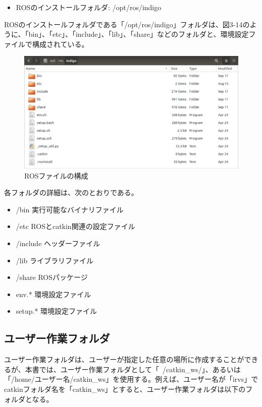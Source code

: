 \begin{itemize}
\item ROSのインストールフォルダ: /opt/ros/indigo
\end{itemize}

ROSのインストールフォルダである「/opt/ros/indigo」フォルダは、図3-14のように、「bin」、「etc」、「include」、「lib」、「share」などのフォルダと、環境設定ファイルで構成されている。

\begin{figure}[h]
  \centering
  \includegraphics[width=\columnwidth]{pictures/chapter3/pic_03_14.png}
  \caption{ROSファイルの構成}
\end{figure}

各フォルダの詳細は、次のとおりである。

\begin{itemize}
\item /bin    実行可能なバイナリファイル
\item /etc    ROSとcatkin関連の設定ファイル
\item /include  ヘッダーファイル
\item /lib    ライブラリファイル
\item /share  ROSパッケージ
\item env.*   環境設定ファイル
\item setup.* 環境設定ファイル
\end{itemize}

\subsection{ユーザー作業フォルダ}

ユーザー作業フォルダは、ユーザーが指定した任意の場所に作成することができるが、本書では、ユーザー作業フォルダとして「~/catkin\_ws/」、あるいは「/home/ユーザー名/catkin\_ws」を使用する。例えば、ユーザー名が「irvs」でcatkinフォルダ名を「catkin\_ws」とすると、ユーザー作業フォルダは以下のフォルダとなる。

